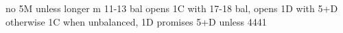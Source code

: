 no 5M unless longer m
11-13 bal opens 1C
with 17-18 bal, opens 1D with 5+D otherwise 1C
when unbalanced, 1D promises 5+D unless 4441